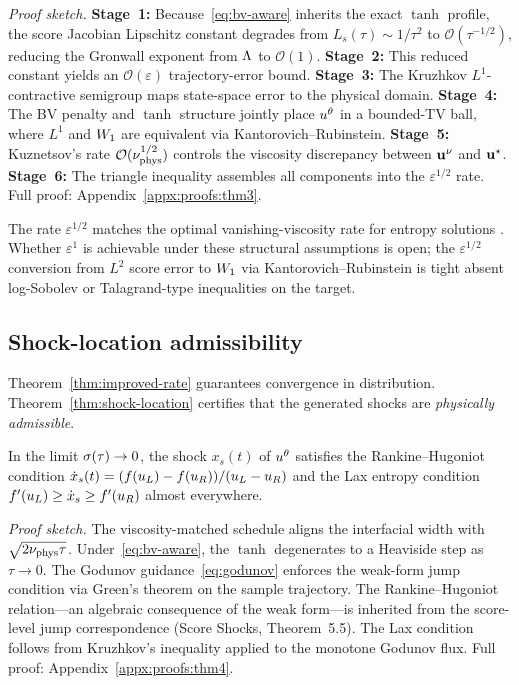 \textit{Proof sketch.} \textbf{Stage~1:} Because~\eqref{eq:bv-aware} inherits the exact $\tanh$ profile, the score Jacobian Lipschitz constant degrades from $L_{s}(\tau)\sim1/\tau^{2}$ to $\mathcal{O}(\tau^{-1/2})$, reducing the Gronwall exponent from $\Lambda$ to $\mathcal{O}(1)$. \textbf{Stage~2:} This reduced constant yields an $\mathcal{O}(\varepsilon)$ trajectory-error bound. \textbf{Stage~3:} The Kruzhkov $L^{1}$-contractive semigroup maps state-space error to the physical domain. \textbf{Stage~4:} The {BV} penalty and $\tanh$ structure jointly place $u^{\theta}$ in a bounded-{TV} ball, where $L^{1}$ and $W_{1}$ are equivalent via Kantorovich--Rubinstein. \textbf{Stage~5:} Kuznetsov's rate $\mathcal{O}(\nu_{\mathrm{phys}}^{1/2})$ \citep{kuznetsov1976} controls the viscosity discrepancy between $\mathbf{u}^{\nu}$ and $\mathbf{u}^{\star}$. \textbf{Stage~6:} The triangle inequality assembles all components into the $\varepsilon^{1/2}$ rate. Full proof: Appendix~\ref{appx:proofs:thm3}.

\begin{remark}
The rate $\varepsilon^{1/2}$ matches the optimal vanishing-viscosity rate for entropy solutions \citep{kuznetsov1976}. Whether $\varepsilon^{1}$ is achievable under these structural assumptions is open; the $\varepsilon^{1/2}$ conversion from $L^{2}$ score error to $W_{1}$ via Kantorovich--Rubinstein is tight absent log-Sobolev or Talagrand-type inequalities on the target.
\end{remark}

\subsection{Shock-location admissibility}
\label{sec:theory:shock-location}

Theorem~\ref{thm:improved-rate} guarantees convergence in distribution. Theorem~\ref{thm:shock-location} certifies that the generated shocks are \emph{physically admissible}.

\begin{theorem}
\label{thm:shock-location}
In the limit $\sigma(\tau)\to0$, the shock $x_{s}(t)$ of $u^{\theta}$ satisfies the Rankine--Hugoniot condition $\dot x_{s}(t) = (f(u_{L})-f(u_{R}))/(u_{L}-u_{R})$ and the Lax entropy condition $f'(u_{L})\ge\dot x_{s}\ge f'(u_{R})$ almost everywhere.
\end{theorem}

\textit{Proof sketch.} The viscosity-matched schedule aligns the interfacial width with $\sqrt{2\nu_{\mathrm{phys}}\tau}$. Under~\eqref{eq:bv-aware}, the $\tanh$ degenerates to a Heaviside step as $\tau\to0$. The Godunov guidance~\eqref{eq:godunov} enforces the weak-form jump condition via Green's theorem on the sample trajectory. The Rankine--Hugoniot relation---an algebraic consequence of the weak form---is inherited from the score-level jump correspondence (Score Shocks, Theorem~5.5). The Lax condition follows from Kruzhkov's inequality applied to the monotone Godunov flux. Full proof: Appendix~\ref{appx:proofs:thm4}.

